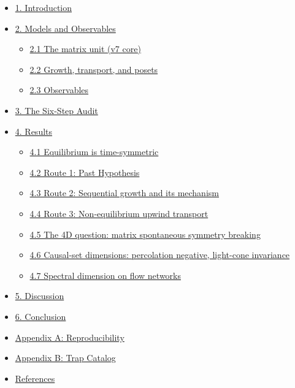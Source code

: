 \begin{itemize}
\tightlist
\item
  \hyperref[1-introduction]{1. Introduction}
\item
  \hyperref[2-models-and-observables]{2. Models and Observables}

  \begin{itemize}
  \tightlist
  \item
    \hyperref[21-the-matrix-unit-v7-core]{2.1 The matrix unit (v7 core)}
  \item
    \hyperref[22-growth-transport-and-posets]{2.2 Growth, transport, and
    posets}
  \item
    \hyperref[23-observables]{2.3 Observables}
  \end{itemize}
\item
  \hyperref[3-the-six-step-audit]{3. The Six-Step Audit}
\item
  \hyperref[4-results]{4. Results}

  \begin{itemize}
  \tightlist
  \item
    \hyperref[41-equilibrium-is-time-symmetric]{4.1 Equilibrium is
    time-symmetric}
  \item
    \hyperref[42-route-1-past-hypothesis]{4.2 Route 1: Past Hypothesis}
  \item
    \hyperref[43-route-2-sequential-growth-and-its-mechanism]{4.3 Route
    2: Sequential growth and its mechanism}
  \item
    \hyperref[44-route-3-non-equilibrium-upwind-transport]{4.4 Route 3:
    Non-equilibrium upwind transport}
  \item
    \hyperref[45-the-4d-question-matrix-spontaneous-symmetry-breaking]{4.5
    The 4D question: matrix spontaneous symmetry breaking}
  \item
    \hyperref[46-causal-set-dimensions-percolation-negative-light-cone-invariance]{4.6
    Causal-set dimensions: percolation negative, light-cone invariance}
  \item
    \hyperref[47-spectral-dimension-on-flow-networks]{4.7 Spectral
    dimension on flow networks}
  \end{itemize}
\item
  \hyperref[5-discussion]{5. Discussion}
\item
  \hyperref[6-conclusion]{6. Conclusion}
\item
  \hyperref[appendix-a-reproducibility]{Appendix A: Reproducibility}
\item
  \hyperref[appendix-b-trap-catalog]{Appendix B: Trap Catalog}
\item
  \hyperref[references]{References}
\end{itemize}


